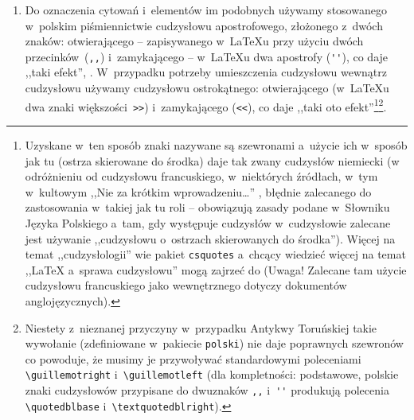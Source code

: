 \begin{enumerate}
\item Do oznaczenia cytowań i~elementów im podobnych używamy stosowanego w~polskim piśmiennictwie cudzysłowu apostrofowego, złożonego z~dwóch znaków: otwierającego -- zapisywanego w~\LaTeX{}u przy użyciu dwóch przecinków~(\verb+,,+) i~zamykającego -- w~\LaTeX{}u dwa apostrofy (\verb+''+), co daje ,,taki efekt'', \cite{cudzyslow_pwn,cudzyslow_wiki}. W~przypadku potrzeby umieszczenia cudzysłowu wewnątrz cudzysłowu używamy cudzysłowu ostrokątnego: otwierającego (w~\LaTeX{}u dwa znaki większości~\verb+>>+) i~zamykającego (\verb+<<+), co daje ,,taki \guillemotright{}oto\guillemotleft{} efekt''\footnote{Uzyskane w~ten sposób znaki nazywane są szewronami a~użycie ich w~sposób jak tu (ostrza skierowane do środka) daje tak zwany cudzysłów niemiecki (w odróżnieniu od cudzysłowu francuskiego, w~niektórych źródłach, w~tym w~kultowym ,,Nie za krótkim wprowadzeniu\ldots'' \cite{lshort2e}, błędnie zalecanego do zastosowania w~takiej jak tu roli -- obowiązują zasady podane w~Słowniku Języka Polskiego \cite{cudzyslow_pwn} a~tam, gdy występuje cudzysłów w~cudzysłowie zalecane jest używanie ,,cudzysłowu o~ostrzach skierowanych do środka''). Więcej na temat ,,cudzysłologii'' wie pakiet \texttt{csquotes} \cite{csquotes} a~chcący wiedzieć więcej na temat ,,{\LaTeX} a~sprawa cudzysłowu'' mogą zajrzeć do \cite{cudzyslow_overleaf} (Uwaga! Zalecane tam użycie cudzysłowu francuskiego jako wewnętrznego dotyczy dokumentów anglojęzycznych).}\footnote{Niestety z~nieznanej przyczyny w~przypadku Antykwy Toruńskiej takie wywołanie (zdefiniowane w~pakiecie \texttt{polski}) nie daje poprawnych szewronów \frownie{} co powoduje, że musimy je przywoływać standardowymi poleceniami \texttt{\textbackslash guillemotright} i~\texttt{\textbackslash guillemotleft}\setcounter{footnote}{1}\footnotemark{} (dla kompletności: podstawowe, polskie znaki cudzysłowów  przypisane do dwuznaków \texttt{,{},} i~\texttt{\'{}\'} produkują polecenia \texttt{\textbackslash quotedblbase} i~\texttt{\textbackslash textquotedblright}).}.
  

\end{enumerate}
